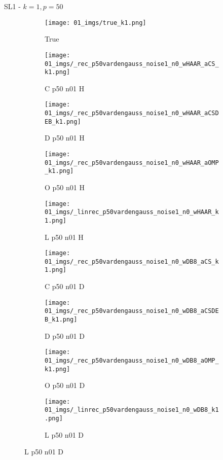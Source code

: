 \begin{frame}{SL1 - $k=1,p=50$}{}
\begin{figure}
\begin{subfigure}{0.1\textwidth}
\texttt{[image: 01\_imgs/true\_k1.png]}
\caption*{\Tiny True}
\end{subfigure}
\begin{subfigure}{0.1\textwidth}
\texttt{[image: 01\_imgs/\_rec\_p50vardengauss\_noise1\_n0\_wHAAR\_aCS\_k1.png]}
\caption*{\Tiny C p50 n01 H}
\end{subfigure}
\begin{subfigure}{0.1\textwidth}
\texttt{[image: 01\_imgs/\_rec\_p50vardengauss\_noise1\_n0\_wHAAR\_aCSDEB\_k1.png]}
\caption*{\Tiny D p50 n01 H}
\end{subfigure}
\begin{subfigure}{0.1\textwidth}
\texttt{[image: 01\_imgs/\_rec\_p50vardengauss\_noise1\_n0\_wHAAR\_aOMP\_k1.png]}
\caption*{\Tiny O p50 n01 H}
\end{subfigure}
\begin{subfigure}{0.1\textwidth}
\texttt{[image: 01\_imgs/\_linrec\_p50vardengauss\_noise1\_n0\_wHAAR\_k1.png]}
\caption*{\Tiny L p50 n01 H}
\end{subfigure}
\begin{subfigure}{0.1\textwidth}
\texttt{[image: 01\_imgs/\_rec\_p50vardengauss\_noise1\_n0\_wDB8\_aCS\_k1.png]}
\caption*{\Tiny C p50 n01 D}
\end{subfigure}
\begin{subfigure}{0.1\textwidth}
\texttt{[image: 01\_imgs/\_rec\_p50vardengauss\_noise1\_n0\_wDB8\_aCSDEB\_k1.png]}
\caption*{\Tiny D p50 n01 D}
\end{subfigure}
\begin{subfigure}{0.1\textwidth}
\texttt{[image: 01\_imgs/\_rec\_p50vardengauss\_noise1\_n0\_wDB8\_aOMP\_k1.png]}
\caption*{\Tiny O p50 n01 D}
\end{subfigure}
\begin{subfigure}{0.1\textwidth}
\texttt{[image: 01\_imgs/\_linrec\_p50vardengauss\_noise1\_n0\_wDB8\_k1.png]}
\caption*{\Tiny L p50 n01 D}
\end{subfigure}

\vspace{5pt}


\end{figure}
\end{frame}
